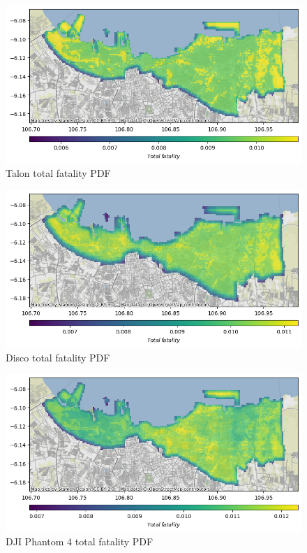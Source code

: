\documentclass[12pt]{report}
\begin{document}
        \begin{figure}[H]
            \centering
            \includegraphics[width=\textwidth]{Plot/talon/total_fatality.png}
            \caption{Talon total fatality PDF}
            \label{fig:talon_fatal}
        \end{figure}
        \begin{figure}[H]
            \centering
            \includegraphics[width=\textwidth]{Plot/parrot/total_fatality-pdf.png}
            \caption{Disco total fatality PDF}
            \label{fig:disco_fatal}
        \end{figure}
        \begin{figure}[H]
            \centering
            \includegraphics[width=\textwidth]{Plot/phantom4/total_fatality_pdf.png}
            \caption{DJI Phantom 4 total fatality PDF}
            \label{fig:phantom_fatal}
        \end{figure}
\end{document}
